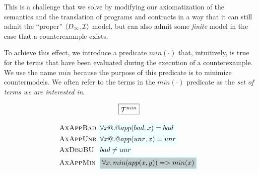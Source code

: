 This is a challenge that we solve by modifying our axiomatization of the semantics
and the translation of programs and contracts in a way that it can still admit
the ``proper'' $\langle D_\infty,{\cal I}\rangle$ model, but can also admit
some {\em finite} model in the case that a counterexample exists.

To achieve this effect, we introduce a predicate $min(\cdot)$ that, intuitively, is true
for the terms that have been evaluated during the execution of a counterexample. We use
the name $min$ because the purpose of this predicate is to minimize countermodels. We often
refer to the terms in the $min(\cdot)$ predicate as the {\em set of terms we are interested in}.

\begin{figure}
{\small
\[\setlength{\arraycolsep}{1pt}
\begin{array}{c}
\ruleform{\ThMin} \\ \\
\begin{array}{lll}
 \textsc{AxAppBad}  & \formula{\forall x @.@ app(\bad,x) = \bad} \\
 \textsc{AxAppUnr}  & \formula{\forall x @.@ app(\unr,x) = \unr} \\
 \textsc{AxDisjBU} & \formula{\bad \neq \unr} \\
 \textsc{AxAppMin}& \formula{\highlight{\forall x, min(app(x,y)) => min(x)}} \\ \\


\end{array}
\end{array}\]}
\end{figure}
